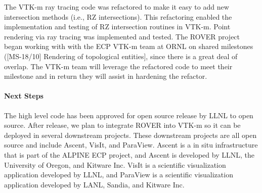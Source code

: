 The VTK-m ray tracing code was refactored to make it easy to add new
intersection methods (i.e., RZ intersections).  This refactoring enabled the
implementation and testing of RZ intersection routines in VTK-m.  Point
rendering via ray tracing was implemented and tested.  The ROVER project began
working with with the ECP VTK-m team at ORNL on shared milestones ([MS-18/10]
Rendering of topological entities], since there is a great deal of overlap. The
VTK-m team will leverage the refactored code to meet their milestone and in
return they will assist in hardening the refactor.  

\paragraph{Next Steps}
The high level code has been approved for open source release by LLNL to open
source.  After release, we plan to integrate ROVER into VTK-m so it can be
deployed in several downstream projects. These downstream projects are all open
source and include Ascent, VisIt, and ParaView. Ascent is a in situ
infrastructure that is part of the ALPINE ECP project, and Ascent is developed
by LLNL, the University of Oregon, and Kitware Inc. VisIt is a scientific
visualization application developed by LLNL, and ParaView is a scientific
visualization application developed by LANL, Sandia, and Kitware Inc.

